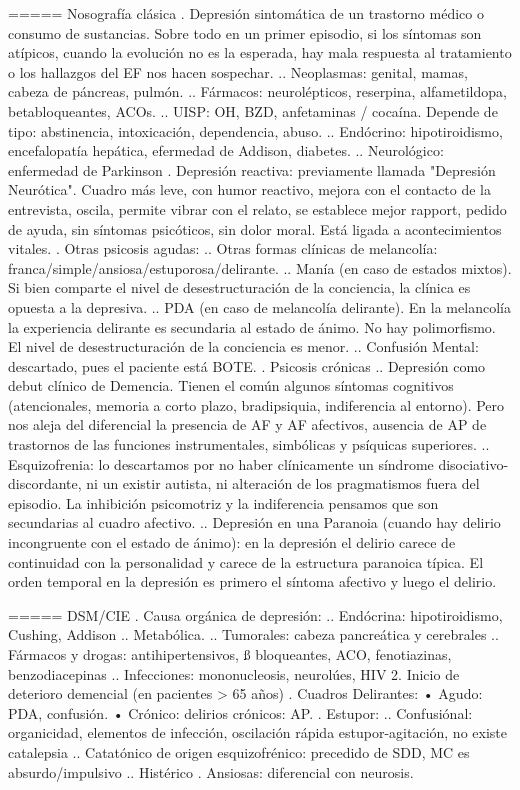 ===== Nosografía clásica
. Depresión sintomática de un trastorno médico o consumo de sustancias. Sobre todo en un primer episodio, si los síntomas son atípicos, cuando la evolución no es la esperada, hay mala respuesta al tratamiento o los hallazgos del EF nos hacen sospechar.
.. Neoplasmas: genital, mamas, cabeza de páncreas, pulmón.
.. Fármacos: neurolépticos, reserpina, alfametildopa, betabloqueantes, ACOs.
.. UISP: OH, BZD, anfetaminas / cocaína. Depende de tipo: abstinencia, intoxicación, dependencia, abuso.
.. Endócrino: hipotiroidismo, encefalopatía hepática, efermedad de Addison, diabetes.
.. Neurológico: enfermedad de Parkinson
. Depresión reactiva: previamente llamada "Depresión Neurótica". Cuadro más leve, con humor reactivo, mejora con el  contacto de la entrevista, oscila, permite vibrar con el relato, se establece mejor rapport, pedido de ayuda, sin síntomas psicóticos, sin dolor moral. Está ligada a acontecimientos vitales.
. Otras psicosis agudas:
.. Otras formas clínicas de melancolía: franca/simple/ansiosa/estuporosa/delirante.
.. Manía (en caso de estados mixtos). Si bien comparte el nivel de desestructuración de la conciencia, la clínica es opuesta a la depresiva.
.. PDA (en caso de melancolía delirante). En la melancolía la experiencia delirante es secundaria al estado de ánimo. No hay polimorfismo. El nivel de desestructuración de la conciencia es menor.
.. Confusión Mental: descartado, pues el paciente está BOTE.
. Psicosis crónicas
.. Depresión como debut clínico de Demencia. Tienen el común algunos síntomas cognitivos (atencionales, memoria a corto plazo, bradipsiquia, indiferencia al entorno). Pero nos aleja del diferencial la presencia de AF y AF afectivos, ausencia de AP de trastornos de las funciones instrumentales, simbólicas y psíquicas superiores.
.. Esquizofrenia: lo descartamos por no haber clínicamente un síndrome disociativo-discordante, ni un existir autista, ni alteración de los pragmatismos fuera del episodio. La inhibición psicomotriz y la indiferencia pensamos que son secundarias al cuadro afectivo.
.. Depresión en una Paranoia (cuando hay delirio incongruente con el estado de ánimo): en la depresión el delirio carece de continuidad con la personalidad y carece de la estructura paranoica típica. El orden temporal en la depresión es primero el síntoma afectivo y luego el delirio.

===== DSM/CIE
. Causa orgánica de depresión:
.. Endócrina: hipotiroidismo, Cushing, Addison
.. Metabólica.
.. Tumorales: cabeza pancreática y cerebrales
.. Fármacos y drogas: antihipertensivos, ß bloqueantes, ACO, fenotiazinas, benzodiacepinas
.. Infecciones: mononucleosis, neurolúes, HIV 2. Inicio de deterioro demencial (en pacientes > 65 años)
. Cuadros Delirantes: • Agudo: PDA, confusión. • Crónico: delirios crónicos: AP.
. Estupor:
.. Confusiónal: organicidad, elementos de infección, oscilación rápida estupor-agitación, no existe catalepsia
.. Catatónico de origen esquizofrénico: precedido de SDD, MC es absurdo/impulsivo
.. Histérico
. Ansiosas: diferencial con neurosis.

